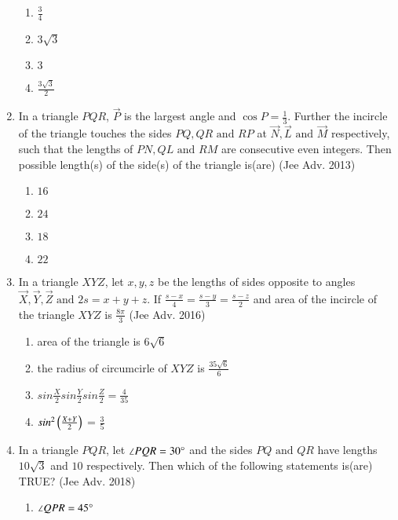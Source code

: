 \begin{enumerate}[label=\thesubsection.\arabic*,ref=\thesubsection.\theenumi]
\begin{multicols}{2}
    	\begin{enumerate}
    		\item ${\frac{3}{4}}$
    		\item $3\sqrt{3}$
    		\item $3$
    		\item ${\frac{3\sqrt{3}}{2}}$
    	\end{enumerate}
    \end{multicols}
    \item In a triangle $PQR$, $\vec{P}$ is the largest angle and $\cos{P} = \frac{1}{3}$. Further the incircle of the triangle touches the sides $PQ,QR \text{ and } RP$ at $\vec{N},\vec{L} \text{ and } \vec{M}$ respectively, such that the lengths of $PN, QL \text{ and } RM$ are consecutive even integers. Then possible length(s) of the side(s) of the triangle is(are)
    \hfill{(Jee Adv. 2013)}
    \begin{multicols}{2}
    	\begin{enumerate}
    		\item $16$
    		\item $24$
    		\item $18$
    		\item $22$
    	\end{enumerate}
    \end{multicols}
    \item In a triangle $XYZ$, let $x,y,z$ be the lengths of sides opposite to angles $\vec{X},\vec{Y},\vec{Z} \text{ and } 2s = x+y+z$. If ${\frac{s-x}{4}}={\frac{s-y}{3}}={\frac{s-z}{2}}$ and area of the incircle of the triangle $XYZ$ is ${\frac{8\pi}{3}}$
    \hfill{(Jee Adv. 2016)}
    \begin{enumerate}
    	\item area of the triangle is $6\sqrt{6}$
    	\item the radius of circumcirle of $XYZ$ is ${\frac{35\sqrt{6}}{6}}$
    	\item $sin\frac{X}{2}sin\frac{Y}{2}sin\frac{Z}{2} = \frac{4}{35}$
    	\item $sin^{2}\left(\frac{X+Y}{2}\right)$ = $\frac{3}{5}$
    \end{enumerate}
    \item In a triangle $PQR$, let $\angle PQR = 30\degree$ and the sides $PQ \text{ and } QR$ have lengths $10\sqrt{3}$ and $10$ respectively. Then which of the following statements is(are) TRUE?
    \hfill{(Jee Adv. 2018)}
    \begin{enumerate}
    	\item $\angle QPR = 45\degree$

\end{enumerate}
\end{enumerate}
